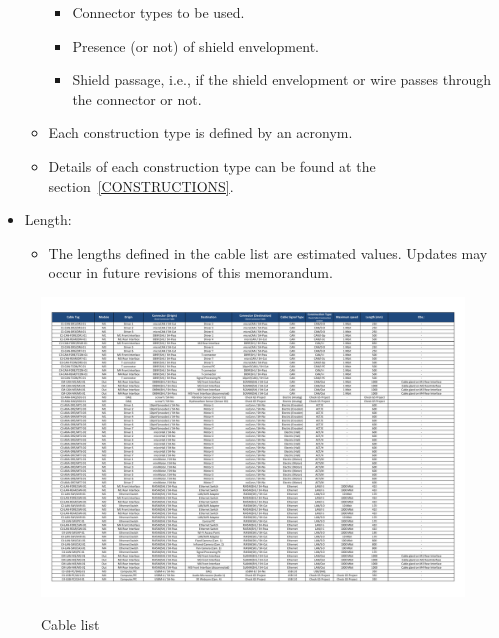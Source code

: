\begin{itemize}
\begin{itemize}
\begin{itemize}
      \item Connector types to be used.
      \item Presence (or not) of shield envelopment.
      \item Shield passage, i.e., if the shield envelopment or wire passes through the connector or not.
    \end{itemize}
    \item Each construction type is defined by an acronym.
    \item Details of each construction type can be found at the section~\ref{CONSTRUCTIONS}.
  \end{itemize}
  \item Length:
  \begin{itemize}
    \item The lengths defined in the cable list are estimated values. Updates may occur in future revisions of this memorandum.
  \end{itemize}
\end{itemize}
\begin{figure}
  \centering
  \includegraphics[angle=90,width=1\columnwidth]{figs/body02/FIGCABLELIST.pdf}\\
  \caption[Cable list]{Cable list}
  \label{FIG:CABLELIST}
\end{figure}
